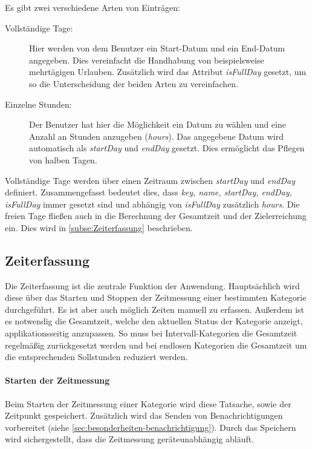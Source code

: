 Es gibt zwei verschiedene Arten von Einträgen:
\begin{description}
    \item[Vollständige Tage:] Hier werden von dem Benutzer ein Start-Datum und ein End-Datum angegeben.
    Dies vereinfacht die Handhabung von beispielsweise mehrtägigen Urlauben.
    Zusätzlich wird das Attribut \textit{isFullDay} gesetzt, um so die Unterscheidung der beiden Arten zu vereinfachen.
    \item[Einzelne Stunden:] Der Benutzer hat hier die Möglichkeit ein Datum zu wählen und eine Anzahl an Stunden anzugeben (\textit{hours}).
    Das angegebene Datum wird automatisch als \textit{startDay} und \textit{endDay} gesetzt.
    Dies ermöglicht das Pflegen von halben Tagen.
\end{description}

Vollständige Tage werden über einen Zeitraum zwischen \textit{startDay} und \textit{endDay} definiert.
Zusammengefasst bedeutet dies, dass \textit{key, name, startDay, endDay, isFullDay} immer gesetzt sind und abhängig von \textit{isFullDay} zusätzlich \textit{hours}.
Die freien Tage fließen auch in die Berechnung der Gesamtzeit und der Zielerreichung ein.
Dies wird in \autoref{subse:Zeiterfassung} beschrieben.

\subsection{Zeiterfassung}\label{subse:Zeiterfassung}
Die Zeiterfassung ist die zentrale Funktion der Anwendung.
Hauptsächlich wird diese über das Starten und Stoppen der Zeitmessung einer bestimmten Kategorie durchgeführt.
Es ist aber auch möglich Zeiten manuell zu erfassen.
Außerdem ist es notwendig die Gesamtzeit, welche den aktuellen Status der Kategorie anzeigt, applikationsseitig anzupassen.
So muss bei Intervall-Kategorien die Gesamtzeit regelmäßig zurückgesetzt werden
und bei endlosen Kategorien die Gesamtzeit um die entsprechenden Sollstunden reduziert werden.

\paragraph{Starten der Zeitmessung}
Beim Starten der Zeitmessung einer Kategorie wird diese Tatsache,
sowie der Zeitpunkt gespeichert.
Zusätzlich wird das Senden von Benachrichtigungen vorbereitet (siehe \autoref{sec:besonderheiten-benachrichtigung}).
Durch das Speichern wird sichergestellt, dass die Zeitmessung geräteunabhängig abläuft.

